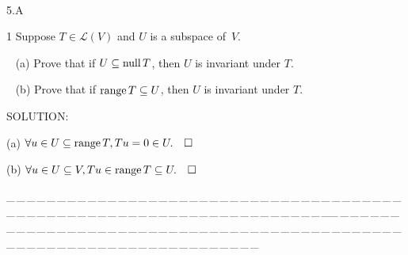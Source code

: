 \documentclass[a4paper, 11pt, UTF8]{article}
\def\range{\textup{range}\,}
\def\null{\textup{null\,}}
\def\Lm{\mathcal{L}}
\begin{document}
\begin{large}
\par{\tiny\,\par}



{\huge\timesbf 5.A} %

{\timesbf\Large 1} {\timessl\Large 
Suppose $T\in\Lm(V)$ and $U$ is a subspace of \,$V$.}\par\,\,\,
(a) {\timessl\Large Prove that if $U\subseteq\null T$, then $U$ is invariant under $T$.}\par\,\,\,
(b) {\timessl\Large Prove that if $\range T\subseteq U$, then $U$ is invariant under $T$.
}\par
{\timesbf S\footnotesize{OLUTION:}}\par\quad
(a) $\forall u\in U\subseteq\range T,Tu=0\in U.\quad\square$\par\quad
(b) $\forall u\in U\subseteq V,Tu\in\range T\subseteq U.\quad\square$
\par
{\tiny \_\,\_\,\_\,\_\,\_\,\_\,\_\,\_\,\_\,\_\,\_\,\_\,\_\,\_\,\_\,\_\,\_\,\_\,\_\,\_\,\_\,\_\,\_\,\_\,\_\,\_\,\_\,\_\,\_\,\_\,\_\,\_\,\_\,\_\,\_\,\_\,\_\,\_\,\_\,\_\,\_\,\_\,\_\,\_\,\_\,\_\,\_\,\_\,\_\,\_\,\_\,\_\,\_\,\_\,\_\,\_\,\_\,\_\,\_\,\_\,\_\,\_\,\_\,\_\,\_\,\_\,\_\,\_\,\_\,\_\,\_\_\,\_\,\_\,\_\,\_\,\_\,\_\,\_\,\_\,\_\,\_\,\_\,\_\,\_\,\_\,\_\,\_\,\_\,\_\,\_\,\_\,\_\,\_\,\_\,\_\,\_\,\_\,\_\,\_\,\_\,\_\,\_\,\_\,\_\,\_\,\_\,\_\,\_\,\_\,\_\,\_\,\_\,\_\,\_\,\_\,\_\,\_\,\_\,\_\,\_\,\_\,\_\,\_\,\_\,\_\,\_\,\_\,\_\,\_\,\_\,\_\,\_\,\_\,\_\,\_\,\_\,\_\,\_\,\_\,\_\,\_}\par


\end{large}
\end{document}
